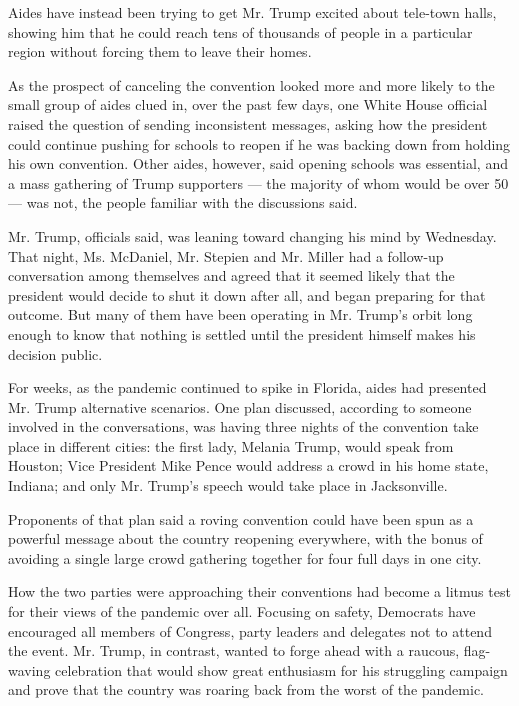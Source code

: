 Aides have instead been trying to get Mr. Trump excited about tele-town
halls, showing him that he could reach tens of thousands of people in a
particular region without forcing them to leave their homes.

As the prospect of canceling the convention looked more and more likely
to the small group of aides clued in, over the past few days, one White
House official raised the question of sending inconsistent messages,
asking how the president could continue pushing for schools to reopen if
he was backing down from holding his own convention. Other aides,
however, said opening schools was essential, and a mass gathering of
Trump supporters --- the majority of whom would be over 50 --- was not,
the people familiar with the discussions said.

Mr. Trump, officials said, was leaning toward changing his mind by
Wednesday. That night, Ms. McDaniel, Mr. Stepien and Mr. Miller had a
follow-up conversation among themselves and agreed that it seemed likely
that the president would decide to shut it down after all, and began
preparing for that outcome. But many of them have been operating in Mr.
Trump's orbit long enough to know that nothing is settled until the
president himself makes his decision public.

For weeks, as the pandemic continued to spike in Florida, aides had
presented Mr. Trump alternative scenarios. One plan discussed, according
to someone involved in the conversations, was having three nights of the
convention take place in different cities: the first lady, Melania
Trump, would speak from Houston; Vice President Mike Pence would address
a crowd in his home state, Indiana; and only Mr. Trump's speech would
take place in Jacksonville.

Proponents of that plan said a roving convention could have been spun as
a powerful message about the country reopening everywhere, with the
bonus of avoiding a single large crowd gathering together for four full
days in one city.

How the two parties were approaching their conventions had become a
litmus test for their views of the pandemic over all. Focusing on
safety, Democrats have encouraged all members of Congress, party leaders
and delegates not to attend the event. Mr. Trump, in contrast, wanted to
forge ahead with a raucous, flag-waving celebration that would show
great enthusiasm for his struggling campaign and prove that the country
was roaring back from the worst of the pandemic.

